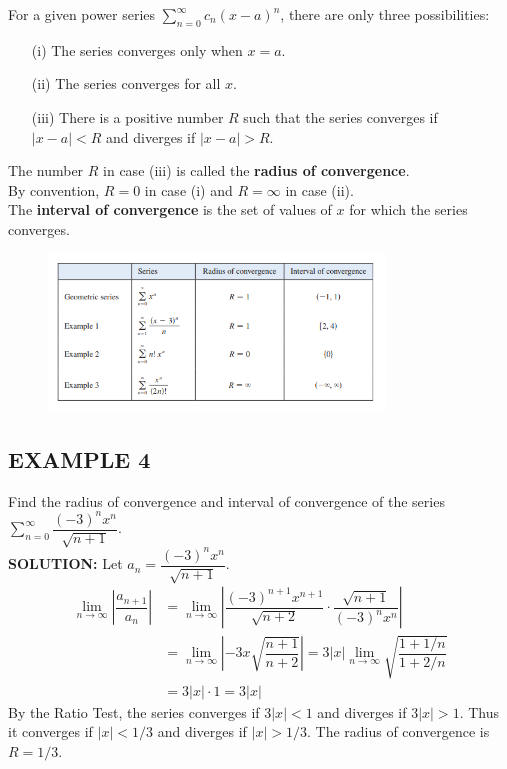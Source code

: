 \documentclass{article}
\theoremstyle{mystyle}
\begin{document}
\begin{tcolorbox}[
    colback=white,
    colframe=orange!80!white,
    title=Theorem: Convergence of a Power Series,
    boxrule=0.5mm,
    arc=3mm
    ]
    For a given power series \( \sum_{n=0}^{\infty} c_n (x-a)^n \), there are only three possibilities:
    \begin{itemize}
        \item[(i)] The series converges only when \(x=a\).
        \item[(ii)] The series converges for all \(x\).
        \item[(iii)] There is a positive number \(R\) such that the series converges if \(|x-a| < R\) and diverges if \(|x-a| > R\).
    \end{itemize}
    The number \(R\) in case (iii) is called the \textbf{radius of convergence}.\\
    By convention, \(R=0\) in case (i) and \(R=\infty\) in case (ii). \\
    The \textbf{interval of convergence} is the set of values of \(x\) for which the series converges.
\end{tcolorbox}

\begin{figure}[htbp]
    \centering
    \includegraphics[width=0.8\textwidth]{graph 77.png}
\end{figure}


\subsection*{EXAMPLE 4}
Find the radius of convergence and interval of convergence of the series \( \sum_{n=0}^{\infty} \dfrac{(-3)^n x^n}{\sqrt{n+1}} \).\\
\textbf{SOLUTION:}
Let \(a_n = \dfrac{(-3)^n x^n}{\sqrt{n+1}}\).
\begin{align*}
    \lim_{n\to\infty} \left| \dfrac{a_{n+1}}{a_n} \right| &= \lim_{n\to\infty} \left| \dfrac{(-3)^{n+1} x^{n+1}}{\sqrt{n+2}} \cdot \dfrac{\sqrt{n+1}}{(-3)^n x^n} \right| \\
    &= \lim_{n\to\infty} \left| -3x \sqrt{\dfrac{n+1}{n+2}} \right| = 3|x| \lim_{n\to\infty} \sqrt{\dfrac{1+1/n}{1+2/n}} \\
    &= 3|x| \cdot 1 = 3|x|
\end{align*}
By the Ratio Test, the series converges if \(3|x| < 1\) and diverges if \(3|x| > 1\). Thus it converges if \(|x| < 1/3\) and diverges if \(|x| > 1/3\).
The radius of convergence is \(R = 1/3\).
\end{document}
